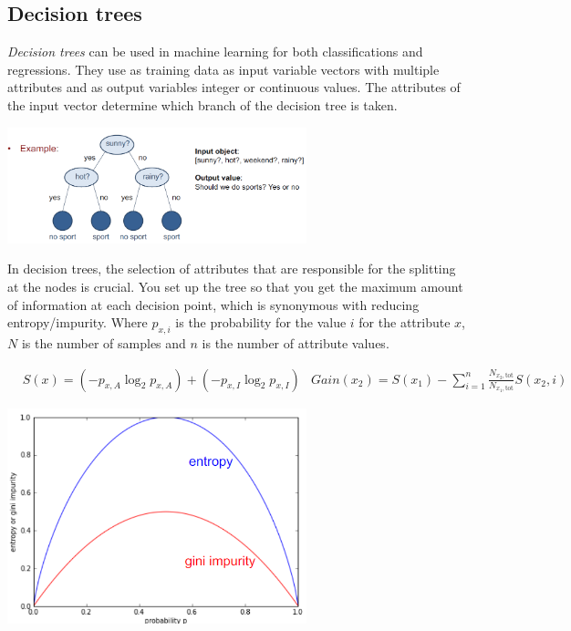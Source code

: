 \subsection{Decision trees}

\emph{Decision trees} can be used in machine learning for both classifications and regressions. They use as training data as input variable vectors with multiple attributes and as output variables integer or continuous values. The attributes of the input vector determine which branch of the decision tree is taken.

\begin{center}\includegraphics[width=0.65\textwidth]{img/machine/MachineDecisionTrees.png}\end{center}

In decision trees, the selection of attributes that are responsible for the splitting at the nodes is crucial. You set up the tree so that you get the maximum amount of information at each decision point, which is synonymous with reducing entropy/impurity. Where $p_{x,i}$ is the probability for the value $i$ for the attribute $x$, $N$ is the number of samples and $n$ is the number of attribute values.

\begin{align}
    &S(x)=\left(-p_{x,A}\log_2p_{x,A}\right)+\left(-p_{x,I}\log_2p_{x,I}\right)&Gain(x_2)=S(x_1)-\sum_{i=1}^{n}\frac{N_{x_2,\mathrm{tot}}}{N_{x_1,\mathrm{tot}}}S(x_2,i)
\end{align}

\begin{center}\includegraphics[width=0.65\textwidth]{img/machine/MachineDecisionTreesEntropy.png}\end{center}

